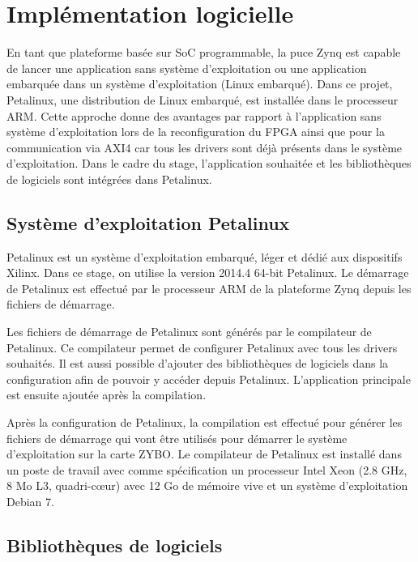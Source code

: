 \section{Implémentation logicielle}
\label{sec:logiciel}
En tant que plateforme basée sur SoC programmable, la puce Zynq est capable de lancer une application sans système d'exploitation
ou une application embarquée dans un système d'exploitation (Linux embarqué). Dans ce projet,
Petalinux, une distribution de Linux embarqué, est installée dans le processeur ARM.
Cette approche donne des avantages par rapport à l'application sans 
système d'exploitation lors de la reconfiguration du FPGA ainsi que pour la communication via
AXI4 car tous les drivers sont déjà présents dans le système d'exploitation.
Dans le cadre du stage, l'application souhaitée et les bibliothèques de logiciels
sont intégrées dans Petalinux.

\subsection{Système d'exploitation Petalinux} %
\label{subsec:petalinux}
Petalinux est un système d'exploitation embarqué, léger et dédié aux dispositifs Xilinx. 
Dans ce stage, on utilise la version 2014.4 64-bit Petalinux.
Le démarrage de Petalinux est effectué par le processeur ARM de la plateforme Zynq depuis
les fichiers de démarrage. 

Les fichiers de démarrage de Petalinux sont générés par le compilateur de Petalinux.
Ce compilateur permet de configurer Petalinux avec tous les drivers souhaités.
Il est aussi possible d'ajouter des bibliothèques de logiciels dans la configuration
afin de pouvoir y accéder depuis Petalinux. 
L'application principale est ensuite ajoutée après la compilation.

Après la configuration de Petalinux, la compilation est effectué pour générer les fichiers de démarrage
qui vont être utilisés pour démarrer le système d'exploitation sur la carte ZYBO.
Le compilateur de Petalinux est installé dans un poste de travail avec comme spécification un 
processeur Intel Xeon (2.8 GHz, 8 Mo L3, quadri-cœur)
avec 12 Go de mémoire vive et un système d'exploitation Debian 7.

\subsection{Bibliothèques de logiciels} %
\label{subsec:embedded}

